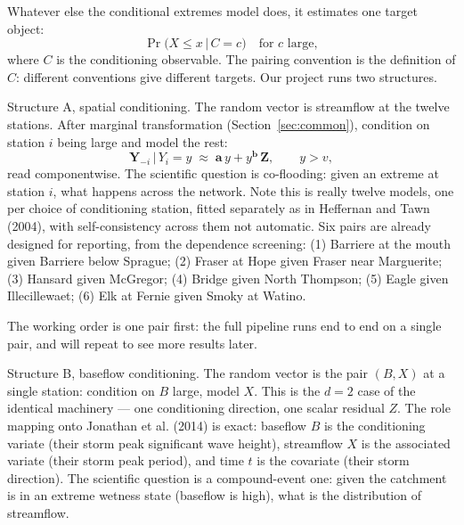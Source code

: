 \documentclass[11pt]{article}
\begin{document}
Whatever else the conditional extremes model does, it estimates one target object:
\[
\Pr\bigl(X \le x \,\big|\, C = c\bigr) \quad \text{for } c \text{ large},
\]
where $C$ is the conditioning observable. The pairing convention is the definition of $C$: different conventions give different targets. Our project runs two structures.

Structure A, spatial conditioning. The random vector is streamflow at the twelve stations. After marginal transformation (Section~\ref{sec:common}), condition on station $i$ being large and model the rest:
\begin{equation}\label{eq:strA}
\mathbf{Y}_{-i} \,\big|\, Y_i = y \;\approx\; \mathbf{a}\, y + y^{\mathbf{b}}\, \mathbf{Z}, \qquad y > v,
\end{equation}
read componentwise. The scientific question is co-flooding: given an extreme at station $i$, what happens across the network. Note this is really twelve models, one per choice of conditioning station, fitted separately as in Heffernan and Tawn (2004), with self-consistency across them not automatic. Six pairs are already designed for reporting, from the dependence screening: (1) Barriere at the mouth given Barriere below Sprague; (2) Fraser at Hope given Fraser near Marguerite; (3) Hansard given McGregor; (4) Bridge given North Thompson; (5) Eagle given Illecillewaet; (6) Elk at Fernie given Smoky at Watino. 

The working order is one pair first: the full pipeline runs end to end on a single pair, and will repeat to see more results later.

Structure B, baseflow conditioning. The random vector is the pair $(B, X)$ at a single station: condition on $B$ large, model $X$. This is the $d = 2$ case of the identical machinery --- one conditioning direction, one scalar residual $Z$. The role mapping onto Jonathan et al. (2014) is exact: baseflow $B$ is the conditioning variate (their storm peak significant wave height), streamflow $X$ is the associated variate (their storm peak period), and time $t$ is the covariate (their storm direction). The scientific question is a compound-event one: given the catchment is in an extreme wetness state (baseflow is high), what is the distribution of streamflow.
\end{document}
